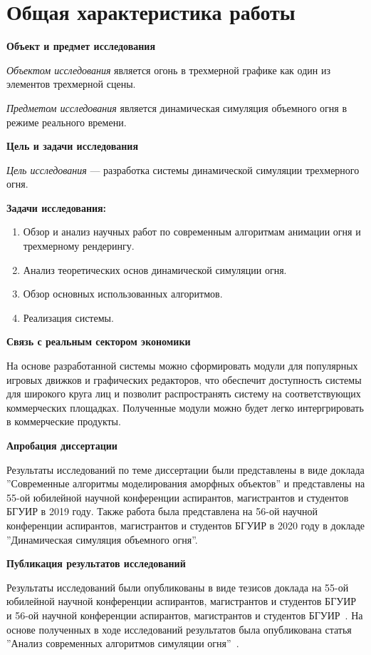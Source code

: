 \part*{Общая характеристика работы}

\textbf{Объект и предмет исследования}

\emph{Объектом исследования} является огонь в трехмерной графике как один из
элементов трехмерной сцены.

\emph{Предметом исследования} является динамическая симуляция объемного огня в
режиме реального времени.

\textbf{Цель и задачи исследования}

\emph{Цель исследования} --- разработка системы динамической симуляции
\break{}трехмерного огня.

\textbf{Задачи исследования:}

\begin{enumerate}
	\item Обзор и анализ научных работ по современным алгоритмам анимации огня и
        трехмерному рендерингу.
	\item Анализ теоретических основ динамической симуляции огня.
	\item Обзор основных использованных алгоритмов.
	\item Реализация системы.
\end{enumerate}

\textbf{Связь с реальным сектором экономики}

На основе разработанной системы можно сформировать модули для популярных игровых
движков и графических редакторов, что обеспечит доступность системы для широкого
круга лиц и позволит распространять систему на соответствующих коммерческих
площадках. Полученные модули можно будет легко интергрировать в коммерческие
продукты.

\textbf{Апробация диссертации}

Результаты исследований по теме диссертации были представлены в виде доклада
''Современные алгоритмы моделирования аморфных объектов'' и представлены на
55-ой юбилейной научной конференции аспирантов, магистрантов и студентов БГУИР
в 2019 году. Также работа была представлена на 56-ой научной конференции
аспирантов, магистрантов и студентов БГУИР в 2020 году в докладе ''Динамическая
симуляция объемного огня''.

\textbf{Публикация результатов исследований}

Результаты исследований были опубликованы в виде тезисов доклада на 55-ой
юбилейной научной конференции аспирантов, магистрантов и студентов
БГУИР~\cite{55_sntk} и 56-ой научной конференции аспирантов, магистрантов и
студентов БГУИР~\cite{56_sntk}.
На основе полученных в ходе исследований
результатов была опубликована статья ''Анализ современных алгоритмов симуляции
огня''~\cite{mol_uch}.
